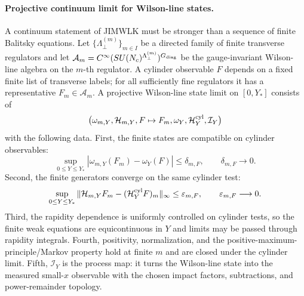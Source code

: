 \paragraph{Projective continuum limit for Wilson-line states.}
A continuum statement of JIMWLK must be stronger than a sequence of finite
Balitsky equations.  Let
\(\{\Lambda_\perp^{(m)}\}_{m\in I}\) be a directed family of finite transverse
regulators and let
\(\mathcal A_m=C^\infty(SU(N_c)^{\Lambda_\perp^{(m)}})^{G_{\rm diag}}\) be
the gauge-invariant Wilson-line algebra on the \(m\)-th regulator.  A
cylinder observable \(F\) depends on a fixed finite list of transverse labels;
for all sufficiently fine regulators it has a representative \(F_m\in
\mathcal A_m\).  A projective Wilson-line state limit on
\([0,Y_*]\) consists of
\[
  \bigl(
    \omega_{m,Y},\mathcal H_{m,Y},F\mapsto F_m,
    \omega_Y,\mathcal H^{\rm cyl}_Y,\mathcal I_Y
  \bigr)
\]
with the following data.  First, the finite states are compatible on cylinder
observables:
\begin{equation}
  \sup_{0\le Y\le Y_*}
  |\omega_{m,Y}(F_m)-\omega_Y(F)|
  \le \delta_{m,F},
  \qquad
  \delta_{m,F}\longrightarrow0 .
  \label{eq:qcd-jimwlk-projective-state-convergence}
\end{equation}
Second, the finite generators converge on the same cylinder test:
\begin{equation}
  \sup_{0\le Y\le Y_*}
  \|
    \mathcal H_{m,Y}F_m-(\mathcal H^{\rm cyl}_YF)_m
  \|_\infty
  \le \varepsilon_{m,F},
  \qquad
  \varepsilon_{m,F}\longrightarrow0 .
  \label{eq:qcd-jimwlk-projective-generator-convergence}
\end{equation}
Third, the rapidity dependence is uniformly controlled on cylinder tests, so
the finite weak equations are equicontinuous in \(Y\) and limits may be
passed through rapidity integrals.  Fourth, positivity, normalization, and the
positive-maximum-principle/Markov property hold at finite \(m\) and are closed
under the cylinder limit.  Fifth, \(\mathcal I_Y\) is the process map: it
turns the Wilson-line state into the measured small-\(x\) observable with the
chosen impact factors, subtractions, and power-remainder topology.

